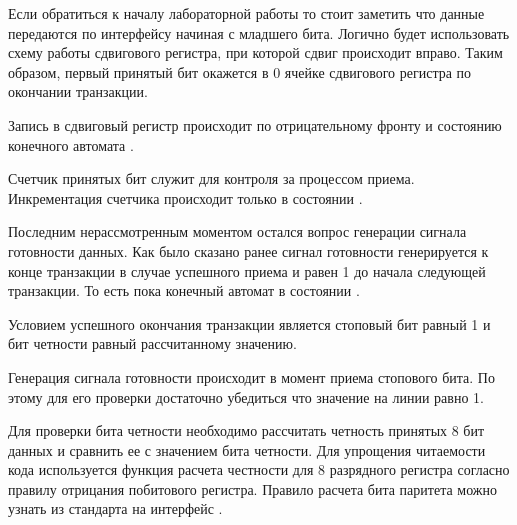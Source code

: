 \par{Если обратиться к началу лабораторной работы то стоит заметить что данные передаются по интерфейсу  начиная с младшего бита. Логично будет использовать схему работы сдвигового регистра, при которой сдвиг происходит вправо. Таким образом, первый принятый бит окажется в 0 ячейке сдвигового регистра по окончании транзакции.}

\par{Запись в сдвиговый регистр происходит по отрицательному фронту  и состоянию конечного автомата .}



\par{Счетчик принятых бит служит для контроля за процессом приема. Инкрементация счетчика происходит только в состоянии .}



\par{Последним нерассмотренным моментом остался вопрос генерации сигнала готовности данных. Как было сказано ранее сигнал готовности генерируется к конце транзакции в случае успешного приема и равен 1 до начала следующей транзакции. То есть пока конечный автомат в состоянии .}

\par{Условием успешного окончания транзакции является стоповый бит равный 1 и бит четности равный рассчитанному значению.}

\par{Генерация сигнала готовности происходит в момент приема стопового бита. По этому для его проверки достаточно убедиться что значение на линии  равно 1.}

\par{Для проверки бита четности необходимо рассчитать четность принятых 8 бит данных и сравнить ее с значением бита четности. Для упрощения читаемости кода используется функция расчета честности для 8 разрядного регистра согласно правилу отрицания побитового  регистра. Правило расчета бита паритета можно узнать из стандарта на интерфейс .}


